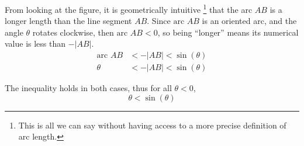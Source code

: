 \documentclass{article}
\begin{document}
	From looking at the figure, it is geometrically intuitive \footnote{This is all we can say without having access to a more precise definition of arc length.} that the arc $AB$ is a longer length than the line segment $AB$. Since $\text{arc }AB$ is an oriented arc, and the angle $\theta$ rotates clockwise, then $\text{arc }AB < 0$, so being ``longer'' means its numerical value is less than $-|AB|$.
	\begin{align*}
		\text{arc }AB &< -|AB| < \sin{(\theta)} \\
		\theta &< -|AB| < \sin{(\theta)}
	\end{align*}
	
	The inequality holds in both cases, thus for all $\theta < 0$,
	$$\theta < \sin{(\theta)}$$
\end{document}
